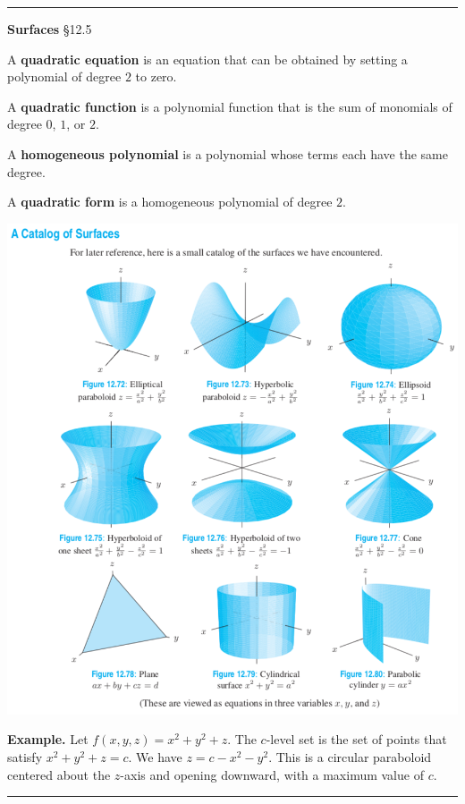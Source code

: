 \documentclass[12pt,letterpaper,noanswers]{exam}
\begin{document}
\vspace{3in}

\vspace{0.2cm}
\hrule
\vspace{0.2cm}

\noindent\textbf{Surfaces} \S 12.5

\begin{tcolorbox}
A \textbf{quadratic equation} is an equation that can be obtained by setting a polynomial of degree $2$ to zero.

A \textbf{quadratic function} is a polynomial function that is the sum of monomials of degree $0$, $1$, or $2$.

A \textbf{homogeneous polynomial} is a polynomial whose terms each have the same degree.

A \textbf{quadratic form} is a homogeneous polynomial of degree $2$.
\end{tcolorbox}



\includegraphics[width=\textwidth]{img/C05surfaces.png}


\noindent\textbf{Example.}  Let $f(x,y,z) = x^2 + y^2 + z$.  The $c$-level set is the set of points that satisfy $x^2+y^2 +z = c$.  We have $z = c - x^2 - y^2.$ This is a circular paraboloid centered about the $z$-axis and opening downward, with a maximum value of $c$.
\vspace{0.3cm}



\vspace{0.2cm}
\hrule
\vspace{0.2cm}
\end{document}
